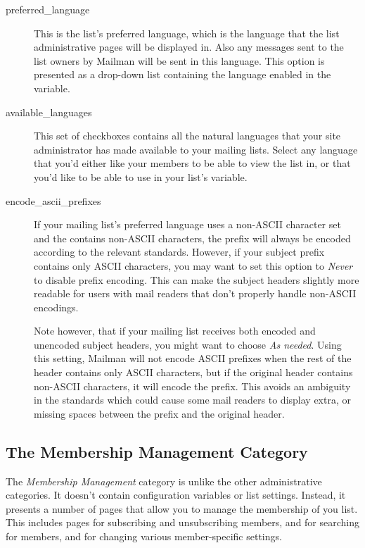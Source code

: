 \documentclass{howto}
\begin{document}
\begin{description}
\item[preferred_language]
    This is the list's preferred language, which is the language that
    the list administrative pages will be displayed in.  Also any
    messages sent to the list owners by Mailman will be sent in this
    language.  This option is presented as a drop-down list containing
    the language enabled in the  variable.

\item[available_languages]
    This set of checkboxes contains all the natural languages that
    your site administrator has made available to your mailing lists.
    Select any language that you'd either like your members to be able
    to view the list in, or that you'd like to be able to use in your
    list's  variable.

\item[encode_ascii_prefixes]
    If your mailing list's preferred language uses a non-ASCII
    character set and the  contains non-ASCII
    characters, the prefix will always be encoded according to the
    relevant standards.  However, if your subject prefix contains only
    ASCII characters, you may want to set this option to \emph{Never}
    to disable prefix encoding.  This can make the subject headers
    slightly more readable for users with mail readers that don't
    properly handle non-ASCII encodings.

    Note however, that if your mailing list receives both encoded and
    unencoded subject headers, you might want to choose \emph{As
    needed}.  Using this setting, Mailman will not encode ASCII
    prefixes when the rest of the header contains only ASCII
    characters, but if the original header contains non-ASCII
    characters, it will encode the prefix.  This avoids an ambiguity
    in the standards which could cause some mail readers to display
    extra, or missing spaces between the prefix and the original
    header.
\end{description}

\subsection{The Membership Management Category}

The \emph{Membership Management} category is unlike the other
administrative categories.  It doesn't contain configuration variables
or list settings.  Instead, it presents a number of pages that allow
you to manage the membership of you list.  This includes pages for
subscribing and unsubscribing members, and for searching for members,
and for changing various member-specific settings.
\end{document}
